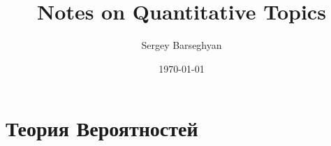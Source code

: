 \documentclass[a4paper,12pt]{book}
\title{Notes on Quantitative Topics}
\date{\today}
\author{Sergey Barseghyan}
\theoremstyle{definition}
\theoremstyle{plain}
\theoremstyle{plain}
\theoremstyle{remark}
\begin{document}
	
	\maketitle
	\chapter{Теория Вероятностей}
	
	
\end{document}
